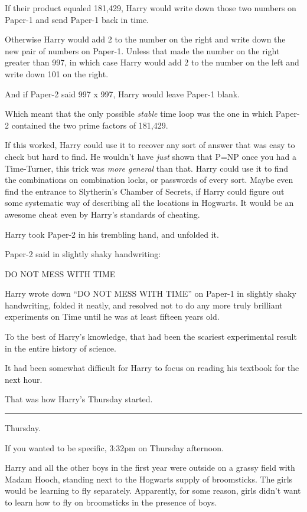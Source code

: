 If their product equaled 181,429, Harry would write down those two
numbers on Paper-1 and send Paper-1 back in time.

Otherwise Harry would add 2 to the number on the right and write down
the new pair of numbers on Paper-1. Unless that made the number on the
right greater than 997, in which case Harry would add 2 to the number on
the left and write down 101 on the right.

And if Paper-2 said 997 x 997, Harry would leave Paper-1 blank.

Which meant that the only possible \emph{stable} time loop was the one
in which Paper-2 contained the two prime factors of 181,429.

If this worked, Harry could use it to recover any sort of answer that
was easy to check but hard to find. He wouldn't have \emph{just} shown
that P=NP once you had a Time-Turner, this trick was \emph{more general}
than that. Harry could use it to find the combinations on combination
locks, or passwords of every sort. Maybe even find the entrance to
Slytherin's Chamber of Secrets, if Harry could figure out some
systematic way of describing all the locations in Hogwarts. It would be
an awesome cheat even by Harry's standards of cheating.

Harry took Paper-2 in his trembling hand, and unfolded it.

Paper-2 said in slightly shaky handwriting:

DO NOT MESS WITH TIME

Harry wrote down ``DO NOT MESS WITH TIME'' on Paper-1 in slightly shaky
handwriting, folded it neatly, and resolved not to do any more truly
brilliant experiments on Time until he was at least fifteen years old.

To the best of Harry's knowledge, that had been the scariest
experimental result in the entire history of science.

It had been somewhat difficult for Harry to focus on reading his
textbook for the next hour.

That was how Harry's Thursday started.

\begin{center}\rule{3in}{0.4pt}\end{center}

Thursday.

If you wanted to be specific, 3:32pm on Thursday afternoon.

Harry and all the other boys in the first year were outside on a grassy
field with Madam Hooch, standing next to the Hogwarts supply of
broomsticks. The girls would be learning to fly separately. Apparently,
for some reason, girls didn't want to learn how to fly on broomsticks in
the presence of boys.

